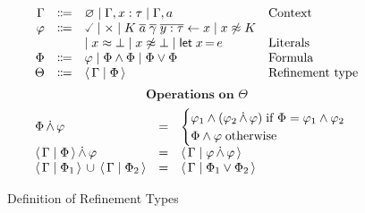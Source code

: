\begin{figure}[htbp]
	\caption{Definition of Refinement Types}
	\label{fig:refinementTypes}
	\centering
	\[
		\begin{array}{rcll}
			\Gamma  & \Coloneqq & \varnothing \mid \Gamma, x:\tau \mid \Gamma, a                                                                                                  & \text{Context}         \\
			\varphi & \Coloneqq & \true \mid \false \mid \ctcon{\genconapp{K}{a}{\gamma}{y:\tau}}{x} \mid x \ntermeq K \\
			        &           & \mid x \termeq \bot \mid x \ntermeq \bot \mid \ctlet{x}{e} & \text{Literals}        \\
			\Phi    & \Coloneqq & \varphi \mid \Phi \wedge \Phi \mid \Phi \vee \Phi                                                                                               & \text{Formula}         \\
			\Theta  & \Coloneqq & \reft{\Gamma}{\Phi}                                                                                                                             & \text{Refinement type} \\
		\end{array}
	\]
    \[ \textbf{Operations on $\Theta$} \]
    \[
    \begin{array}{lcl}
        \Phi \,\dot{\wedge}\, \varphi &=&
        \begin{cases}
            \varphi_1 \wedge (\varphi_2 \,\dot{\wedge}\, \varphi) \; \textrm{if }\Phi = \varphi_1 \wedge \varphi_2 \\
            \Phi \wedge \varphi \; \textrm{otherwise} \\
        \end{cases}\\
        \langle \, \Gamma \mid \Phi \, \rangle \,\dot{\wedge}\, \varphi &=&
            \langle \, \Gamma \mid \varphi \,\dot{\wedge}\, \varphi \, \rangle\\
        \langle \, \Gamma \mid \Phi_1 \, \rangle \,\cup\, \langle \, \Gamma \mid \Phi_2 \, \rangle &=& \langle \, \Gamma \mid \Phi_1 \vee \Phi_2 \, \rangle \\
    \end{array}
    \]
\end{figure}

